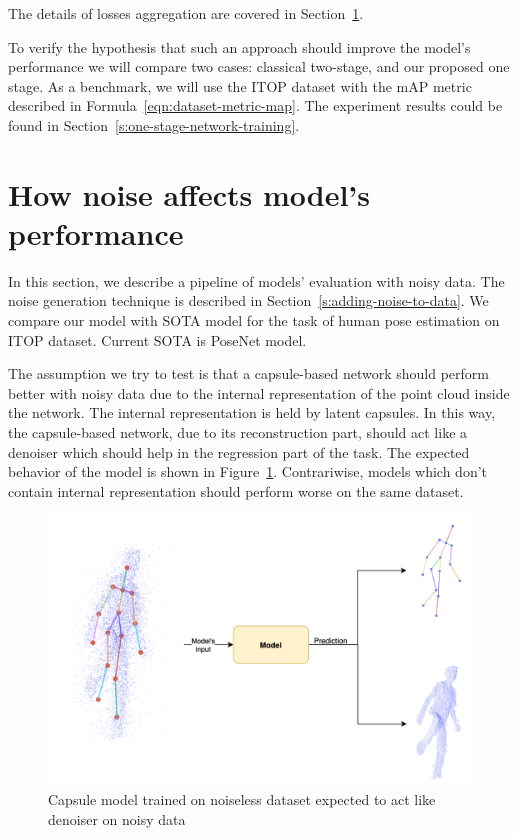 The details of losses aggregation are covered in Section~\ref{s:how-noise-affects-models-performance}.

To verify the hypothesis that such an approach should improve the model's performance we will compare two cases: classical two-stage, and our proposed one stage. As a benchmark, we will use the ITOP dataset with the mAP metric described in Formula~\ref{eqn:dataset-metric-map}. The experiment results could be found in Section~\ref{s:one-stage-network-training}.
 

\section{How noise affects model's performance}
\label{s:how-noise-affects-models-performance}

In this section, we describe a pipeline of models' evaluation with noisy data. The noise generation technique is described in Section~\ref{s:adding-noise-to-data}.
We compare our model with SOTA model for the task of human pose estimation on ITOP \parencite{haque_towards_2016} dataset. Current SOTA is PoseNet \parencite{moon_v2v-posenet_2018} model.

The assumption we try to test is that a capsule-based network should perform better with noisy data due to the internal representation of the point cloud inside the network. The internal representation is held by latent capsules. In this way, the capsule-based network, due to its reconstruction part, should act like a denoiser which should help in the regression part of the task. The expected behavior of the model is shown in Figure~\ref{img:denoising}. Contrariwise, models which don't contain internal representation should perform worse on the same dataset.

\begin{figure}[htbp]
    \centerline{
            \includegraphics[scale=.2]{Figures/noise-model-scheme.png}}
    \caption{Capsule model trained on noiseless dataset expected to act like denoiser on noisy data}
    \label{img:denoising}
\end{figure}

